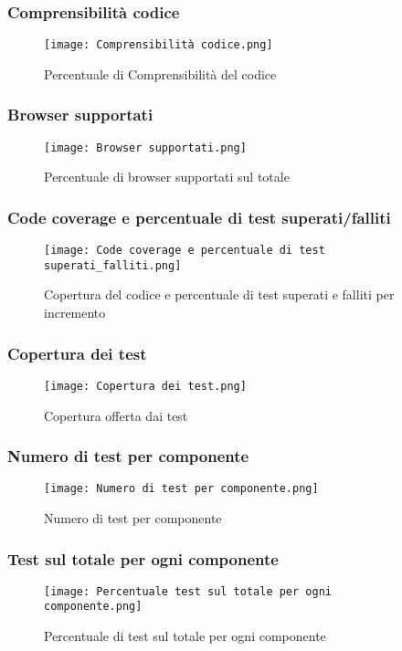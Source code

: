     \subsubsection{Comprensibilità codice}
    \begin{figure}[H]
      \centering
      \texttt{[image: Comprensibilità codice.png]}
      \caption{Percentuale di Comprensibilità del codice}
    \end{figure}

    \subsubsection{Browser supportati}
    \begin{figure}[H]
      \centering
      \texttt{[image: Browser supportati.png]}
      \caption{Percentuale di browser supportati sul totale}
    \end{figure}

    \subsubsection{Code coverage e percentuale di test superati/falliti}
    \begin{figure}[H]
      \centering
      \texttt{[image: Code coverage e percentuale di test superati\_falliti.png]}
      \caption{Copertura del codice e percentuale di test superati e falliti per incremento}
    \end{figure}

    \subsubsection{Copertura dei test}
    \begin{figure}[H]
      \centering
      \texttt{[image: Copertura dei test.png]}
      \caption{Copertura offerta dai test}
    \end{figure}

    \subsubsection{Numero di test per componente}
    \begin{figure}[H]
      \centering
      \texttt{[image: Numero di test per componente.png]}
      \caption{Numero di test per componente}
    \end{figure}

    \subsubsection{Test sul totale per ogni componente}
    \begin{figure}[H]
      \centering
      \texttt{[image: Percentuale test sul totale per ogni componente.png]}
      \caption{Percentuale di test sul totale per ogni componente}
    \end{figure}
